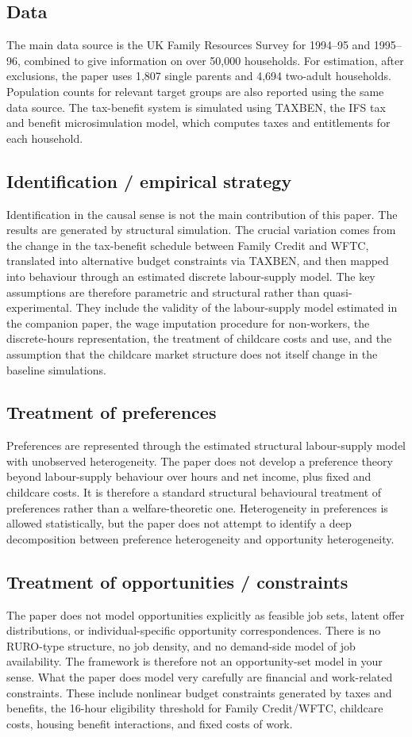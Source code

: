 \documentclass[11pt,a4paper]{article}
\begin{document}
\subsection*{Data}
The main data source is the UK Family Resources Survey for 1994–95 and 1995–96, combined to give information on over 50,000 households. For estimation, after exclusions, the paper uses 1,807 single parents and 4,694 two-adult households. Population counts for relevant target groups are also reported using the same data source. The tax-benefit system is simulated using TAXBEN, the IFS tax and benefit microsimulation model, which computes taxes and entitlements for each household.

\subsection*{Identification / empirical strategy}
Identification in the causal sense is not the main contribution of this paper. The results are generated by structural simulation. The crucial variation comes from the change in the tax-benefit schedule between Family Credit and WFTC, translated into alternative budget constraints via TAXBEN, and then mapped into behaviour through an estimated discrete labour-supply model. The key assumptions are therefore parametric and structural rather than quasi-experimental. They include the validity of the labour-supply model estimated in the companion paper, the wage imputation procedure for non-workers, the discrete-hours representation, the treatment of childcare costs and use, and the assumption that the childcare market structure does not itself change in the baseline simulations.

\subsection*{Treatment of preferences}
Preferences are represented through the estimated structural labour-supply model with unobserved heterogeneity. The paper does not develop a preference theory beyond labour-supply behaviour over hours and net income, plus fixed and childcare costs. It is therefore a standard structural behavioural treatment of preferences rather than a welfare-theoretic one. Heterogeneity in preferences is allowed statistically, but the paper does not attempt to identify a deep decomposition between preference heterogeneity and opportunity heterogeneity.

\subsection*{Treatment of opportunities / constraints}
The paper does not model opportunities explicitly as feasible job sets, latent offer distributions, or individual-specific opportunity correspondences. There is no RURO-type structure, no job density, and no demand-side model of job availability. The framework is therefore not an opportunity-set model in your sense. What the paper does model very carefully are financial and work-related constraints. These include nonlinear budget constraints generated by taxes and benefits, the 16-hour eligibility threshold for Family Credit/WFTC, childcare costs, housing benefit interactions, and fixed costs of work.
\end{document}
